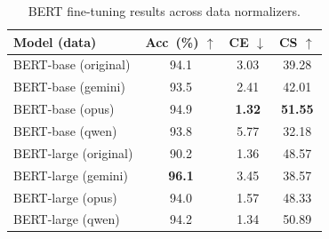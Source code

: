 \begin{table}[t]
  \centering
  \caption{BERT fine-tuning results across data normalizers.}
  \label{tab:bert_variants}
  \begin{tabular}{lccc}
    \toprule
    Model (data) & Acc~(\%) $\uparrow$ & CE $\downarrow$ & CS $\uparrow$ \\
    \midrule
    BERT-base (original) & 94.1 & 3.03 & 39.28 \\
    BERT-base (gemini) & 93.5 & 2.41 & 42.01 \\
    BERT-base (opus) & 94.9 & \textbf{1.32} & \textbf{51.55} \\
    BERT-base (qwen) & 93.8 & 5.77 & 32.18 \\
    \midrule
    BERT-large (original) & 90.2 & 1.36 & 48.57 \\
    BERT-large (gemini) & \textbf{96.1} & 3.45 & 38.57 \\
    BERT-large (opus) & 94.0 & 1.57 & 48.33 \\
    BERT-large (qwen) & 94.2 & 1.34 & 50.89 \\
    \bottomrule
  \end{tabular}
\end{table}
